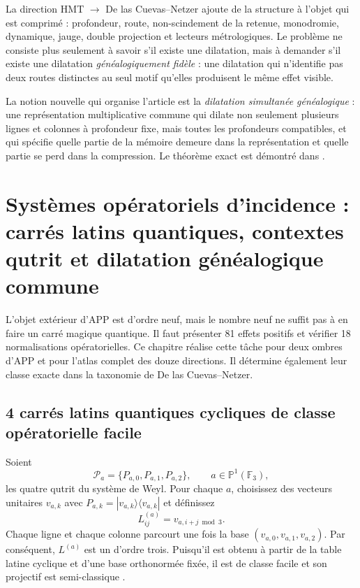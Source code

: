 La direction HMT $\longrightarrow$ De las Cuevas--Netzer ajoute de la structure à l'objet qui
est comprimé : profondeur, route, non-scindement de la retenue, monodromie, dynamique,
jauge, double projection et lecteurs métrologiques. Le problème ne consiste plus
seulement à savoir s'il existe une dilatation, mais à demander s'il existe une dilatation
\emph{généalogiquement fidèle} : une dilatation qui n'identifie pas deux routes distinctes au seul motif
qu'elles produisent le même effet visible.

\begin{bridgebox}
La notion nouvelle qui organise l'article est la \emph{dilatation simultanée
généalogique} : une représentation multiplicative commune qui dilate non seulement plusieurs
lignes et colonnes à profondeur fixe, mais toutes les profondeurs compatibles,
et qui spécifie quelle partie de la mémoire demeure dans la représentation et quelle
partie se perd dans la compression. Le théorème exact est démontré dans
.
\end{bridgebox}


\section[Systèmes opératoriels d'incidence]{Systèmes opératoriels
d'incidence : carrés latins quantiques, contextes qutrit et dilatation
généalogique commune}
\label{p12-83-c22-s3:gmc:chap:qms}

L'objet extérieur d'APP est d'ordre neuf, mais le nombre neuf ne suffit pas
à en faire un carré magique quantique. Il faut présenter 81 effets
positifs et vérifier 18 normalisations opératorielles. Ce chapitre réalise
cette tâche pour deux ombres d'APP et pour l'atlas complet des douze
directions. Il détermine également leur classe exacte dans la taxonomie de De las
Cuevas--Netzer.

\subsection{4 carrés latins quantiques cycliques de classe opératorielle facile}

Soient
\[
 \mathcal P_a=\{P_{a,0},P_{a,1},P_{a,2}\},
 \qquad a\in\mathbb P^1(\mathbb F_3),
 \tag{GMC-4.1}
\]
les quatre \PVM qutrit du système de Weyl. Pour chaque $a$, choisissez des vecteurs
unitaires $v_{a,k}$ avec
$P_{a,k}=|v_{a,k}\rangle\langle v_{a,k}|$ et définissez
\[
 L^{(a)}_{ij}=v_{a,i+j\bmod3}.
 \tag{GMC-4.2}
\]
Chaque ligne et chaque colonne parcourt une fois la base
$(v_{a,0},v_{a,1},v_{a,2})$. Par conséquent, $L^{(a)}$ est un \QLS d'ordre trois.
Puisqu'il est obtenu à partir de la table latine cyclique et d'une base orthonormée fixée, il est de classe facile et son
\QMS projectif est semi-classique
\citep{delascuevas2023latin}.

